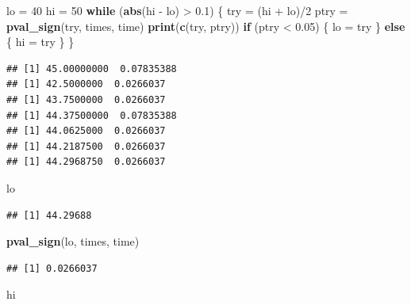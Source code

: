 \documentclass[]{tufte-book}
\newenvironment{Shaded}{}{}
\newcommand{\ControlFlowTok}[1]{\textcolor[rgb]{0.00,0.44,0.13}{\textbf{#1}}}
\newcommand{\DecValTok}[1]{\textcolor[rgb]{0.25,0.63,0.44}{#1}}
\newcommand{\FloatTok}[1]{\textcolor[rgb]{0.25,0.63,0.44}{#1}}
\newcommand{\KeywordTok}[1]{\textcolor[rgb]{0.00,0.44,0.13}{\textbf{#1}}}
\newcommand{\NormalTok}[1]{#1}
\newcommand{\OperatorTok}[1]{\textcolor[rgb]{0.40,0.40,0.40}{#1}}
\newcommand{\StringTok}[1]{\textcolor[rgb]{0.25,0.44,0.63}{#1}}
\theoremstyle{definition}
\theoremstyle{definition}
\theoremstyle{definition}
\theoremstyle{remark}
\begin{document}
\begin{Shaded}
\begin{Highlighting}[]
\NormalTok{lo =}\StringTok{ }\DecValTok{40}
\NormalTok{hi =}\StringTok{ }\DecValTok{50}
\ControlFlowTok{while}\NormalTok{ (}\KeywordTok{abs}\NormalTok{(hi }\OperatorTok{-}\StringTok{ }\NormalTok{lo) }\OperatorTok{>}\StringTok{ }\FloatTok{0.1}\NormalTok{) \{}
\NormalTok{    try =}\StringTok{ }\NormalTok{(hi }\OperatorTok{+}\StringTok{ }\NormalTok{lo)}\OperatorTok{/}\DecValTok{2}
\NormalTok{    ptry =}\StringTok{ }\KeywordTok{pval_sign}\NormalTok{(try, times, time)}
    \KeywordTok{print}\NormalTok{(}\KeywordTok{c}\NormalTok{(try, ptry))}
    \ControlFlowTok{if}\NormalTok{ (ptry }\OperatorTok{<}\StringTok{ }\FloatTok{0.05}\NormalTok{) \{}
\NormalTok{        lo =}\StringTok{ }\NormalTok{try}
\NormalTok{    \} }\ControlFlowTok{else}\NormalTok{ \{}
\NormalTok{        hi =}\StringTok{ }\NormalTok{try}
\NormalTok{    \}}
\NormalTok{\}}
\end{Highlighting}
\end{Shaded}

\begin{verbatim}
## [1] 45.00000000  0.07835388
## [1] 42.5000000  0.0266037
## [1] 43.7500000  0.0266037
## [1] 44.37500000  0.07835388
## [1] 44.0625000  0.0266037
## [1] 44.2187500  0.0266037
## [1] 44.2968750  0.0266037
\end{verbatim}

\begin{Shaded}
\begin{Highlighting}[]
\NormalTok{lo}
\end{Highlighting}
\end{Shaded}

\begin{verbatim}
## [1] 44.29688
\end{verbatim}

\begin{Shaded}
\begin{Highlighting}[]
\KeywordTok{pval_sign}\NormalTok{(lo, times, time)}
\end{Highlighting}
\end{Shaded}

\begin{verbatim}
## [1] 0.0266037
\end{verbatim}

\begin{Shaded}
\begin{Highlighting}[]
\NormalTok{hi}
\end{Highlighting}
\end{Shaded}
\end{document}
